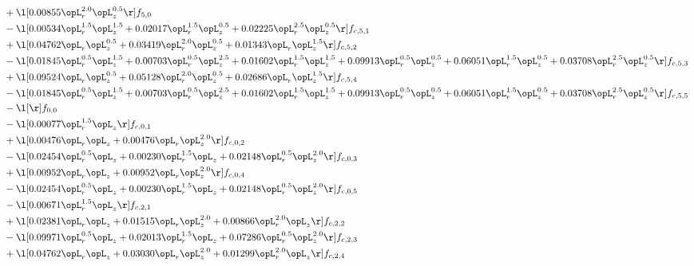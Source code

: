 \begin{alignat}{2}
& + \l[  0.00855 \opL_r^{2.0} \opL_z^{0.5}  \r] f_{5,0} \nonumber \\ 
& - \l[  0.00534 \opL_r^{1.5} \opL_z^{1.5} +  0.02017 \opL_r^{1.5} \opL_z^{0.5} +  0.02225 \opL_r^{2.5} \opL_z^{0.5}  \r] f_{c,5,1} \nonumber \\ 
& + \l[  0.04762 \opL_r \opL_z^{0.5} +  0.03419 \opL_r^{2.0} \opL_z^{0.5} +  0.01343 \opL_r \opL_z^{1.5}  \r] f_{c,5,2} \nonumber \\ 
& - \l[  0.01845 \opL_r^{0.5} \opL_z^{1.5} +  0.00703 \opL_r^{0.5} \opL_z^{2.5} +  0.01602 \opL_r^{1.5} \opL_z^{1.5} +  0.09913 \opL_r^{0.5} \opL_z^{0.5} +  0.06051 \opL_r^{1.5} \opL_z^{0.5} +  0.03708 \opL_r^{2.5} \opL_z^{0.5}  \r] f_{c,5,3} \nonumber \\ 
& + \l[  0.09524 \opL_r \opL_z^{0.5} +  0.05128 \opL_r^{2.0} \opL_z^{0.5} +  0.02686 \opL_r \opL_z^{1.5}  \r] f_{c,5,4} \nonumber \\ 
& - \l[  0.01845 \opL_r^{0.5} \opL_z^{1.5} +  0.00703 \opL_r^{0.5} \opL_z^{2.5} +  0.01602 \opL_r^{1.5} \opL_z^{1.5} +  0.09913 \opL_r^{0.5} \opL_z^{0.5} +  0.06051 \opL_r^{1.5} \opL_z^{0.5} +  0.03708 \opL_r^{2.5} \opL_z^{0.5}  \r] f_{c,5,5} \nonumber \\ 
& - \l[  \r] f_{0,0} \nonumber \\ 
& - \l[  0.00077 \opL_r^{1.5} \opL_z  \r] f_{c,0,1} \nonumber \\ 
& + \l[  0.00476 \opL_r \opL_z +  0.00476 \opL_r \opL_z^{2.0}  \r] f_{c,0,2} \nonumber \\ 
& - \l[  0.02454 \opL_r^{0.5} \opL_z +  0.00230 \opL_r^{1.5} \opL_z +  0.02148 \opL_r^{0.5} \opL_z^{2.0}  \r] f_{c,0,3} \nonumber \\ 
& + \l[  0.00952 \opL_r \opL_z +  0.00952 \opL_r \opL_z^{2.0}  \r] f_{c,0,4} \nonumber \\ 
& - \l[  0.02454 \opL_r^{0.5} \opL_z +  0.00230 \opL_r^{1.5} \opL_z +  0.02148 \opL_r^{0.5} \opL_z^{2.0}  \r] f_{c,0,5} \nonumber \\ 
& - \l[  0.00671 \opL_r^{1.5} \opL_z  \r] f_{c,2,1} \nonumber \\ 
& + \l[  0.02381 \opL_r \opL_z +  0.01515 \opL_r \opL_z^{2.0} +  0.00866 \opL_r^{2.0} \opL_z  \r] f_{c,2,2} \nonumber \\ 
& - \l[  0.09971 \opL_r^{0.5} \opL_z +  0.02013 \opL_r^{1.5} \opL_z +  0.07286 \opL_r^{0.5} \opL_z^{2.0}  \r] f_{c,2,3} \nonumber \\ 
& + \l[  0.04762 \opL_r \opL_z +  0.03030 \opL_r \opL_z^{2.0} +  0.01299 \opL_r^{2.0} \opL_z  \r] f_{c,2,4} \nonumber \\ 

\end{alignat}
